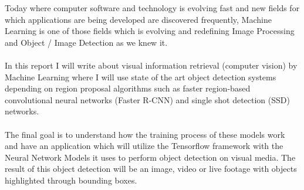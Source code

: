 
Today where computer software and technology is evolving fast and new fields for which applications are being developed are discovered
frequently, Machine Learning is one of those fields which is evolving and redefining Image Processing and Object / Image Detection as we
knew it.\\ \\
In this report I will write about visual information retrieval (computer vision) by Machine Learning where I will use state of the art
object detection systems depending on region proposal algorithms such as faster region-based convolutional neural networks (Faster R-CNN)
and single shot detection (SSD) networks.\\ \\
The final goal is to understand how the training process of these models work and have an application which will utilize the Tensorflow
framework with the Neural Network Models it uses to perform object detection on visual media. The result of this object detection will be an
image, video or live footage with objects highlighted through bounding boxes.

